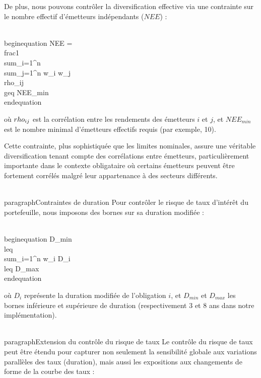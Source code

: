 De plus, nous pouvons contrôler la diversification effective via une contrainte sur le nombre effectif d'émetteurs indépendants ($NEE$) :

\\begin{equation}
NEE = \\frac{1}{\\sum_{i=1}^{n} \\sum_{j=1}^{n} w_i w_j \\rho_{ij}} \\geq NEE_{min}
\\end{equation}

où $\\rho_{ij}$ est la corrélation entre les rendements des émetteurs $i$ et $j$, et $NEE_{min}$ est le nombre minimal d'émetteurs effectifs requis (par exemple, 10).

Cette contrainte, plus sophistiquée que les limites nominales, assure une véritable diversification tenant compte des corrélations entre émetteurs, particulièrement importante dans le contexte obligataire où certains émetteurs peuvent être fortement corrélés malgré leur appartenance à des secteurs différents.

\\paragraph{Contraintes de duration} 
Pour contrôler le risque de taux d'intérêt du portefeuille, nous imposons des bornes sur sa duration modifiée :

\\begin{equation}
D_{min} \\leq \\sum_{i=1}^n w_i D_i \\leq D_{max}
\\end{equation}

où $D_i$ représente la duration modifiée de l'obligation $i$, et $D_{min}$ et $D_{max}$ les bornes inférieure et supérieure de duration (respectivement 3 et 8 ans dans notre implémentation).

\\paragraph{Extension du contrôle du risque de taux}
Le contrôle du risque de taux peut être étendu pour capturer non seulement la sensibilité globale aux variations parallèles des taux (duration), mais aussi les expositions aux changements de forme de la courbe des taux :

